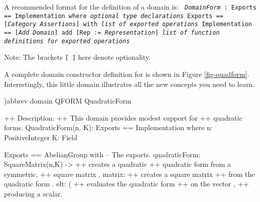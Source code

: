 {{{{%
\beginImportant
A recommended format for the definition of a domain is:\newline
{\tt%
{\it DomainForm} : Exports  ==  Implementation where \newline
\hspace*{.75pc} {\it optional type declarations} \newline
\hspace*{.75pc} Exports  ==  [{\it Category Assertions}] with \newline
\hspace*{2.0pc}   {\it list of exported operations} \newline
\hspace*{.75pc} Implementation  ==  [{\it Add Domain}] add \newline
\hspace*{2.0pc}   [Rep := {\it Representation}] \newline
\hspace*{2.0pc}   {\it list of function definitions for exported operations}
}

Note: The brackets {\tt [ ]} here denote optionality.
\endImportant

A complete domain constructor definition for
 is shown in Figure \ref{fig-quadform}.
Interestingly, this little domain illustrates all the new
concepts you need to learn.

\begin{figXmpLines}[caption={The \textspadtype{QuadraticForm} domain.},label={fig-quadform}]
)abbrev domain QFORM QuadraticForm

++ Description:
++   This domain provides modest support for
++   quadratic forms.
QuadraticForm(n, K): Exports == Implementation where
    n: PositiveInteger
    K: Field

    Exports == AbelianGroup with                         -- The exports.
      quadraticForm: SquareMatrix(n,K) -> %
        ++  creates a quadratic
        ++ quadratic form from a symmetric,
        ++ square matrix .
      matrix: %
        ++  creates a square matrix
        ++ from the quadratic form .
      elt: (%
        ++  evaluates the quadratic form
        ++  on the vector ,
        ++ producing a scalar.


\end{figXmpLines}}}}}
